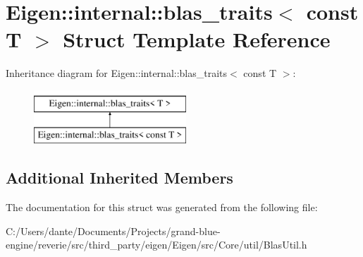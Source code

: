 \hypertarget{struct_eigen_1_1internal_1_1blas__traits_3_01const_01_t_01_4}{}\section{Eigen\+::internal\+::blas\+\_\+traits$<$ const T $>$ Struct Template Reference}
\label{struct_eigen_1_1internal_1_1blas__traits_3_01const_01_t_01_4}
Inheritance diagram for Eigen\+::internal\+::blas\+\_\+traits$<$ const T $>$\+:\begin{figure}[H]
\begin{center}
\leavevmode
\includegraphics[height=2.000000cm]{struct_eigen_1_1internal_1_1blas__traits_3_01const_01_t_01_4}
\end{center}
\end{figure}
\subsection*{Additional Inherited Members}


The documentation for this struct was generated from the following file\+:\begin{DoxyCompactItemize}
\item 
C\+:/\+Users/dante/\+Documents/\+Projects/grand-\/blue-\/engine/reverie/src/third\+\_\+party/eigen/\+Eigen/src/\+Core/util/Blas\+Util.\+h\end{DoxyCompactItemize}
